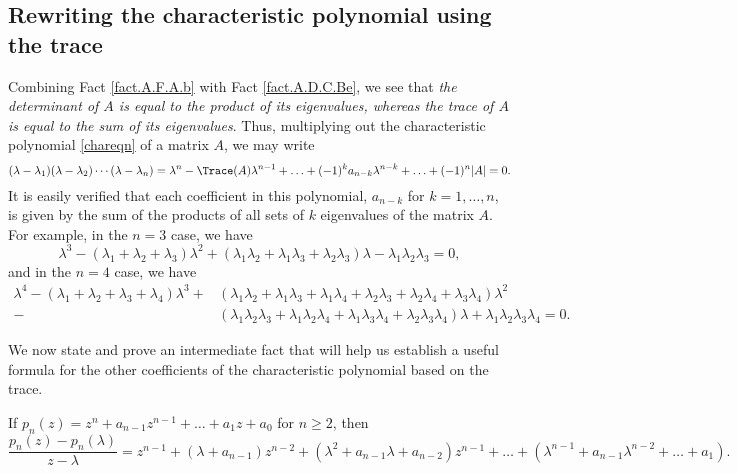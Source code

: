 \subsection{Rewriting the characteristic polynomial using the trace}

Combining Fact \ref{fact.A.F.A.b} with Fact \ref{fact.A.D.C.Be}, we see that
{\it the determinant of $A$ is equal to the product of its eigenvalues,
whereas the trace of $A$ is equal to the sum of its eigenvalues}.  Thus, multiplying out the characteristic polynomial \eqref{chareqn} of a matrix $A$, we may write
\begin{equation}
  (\lambda-\lambda_1) (\lambda-\lambda_2) \cdots (\lambda - \lambda_n) = \lambda^n - \Trace(A) \lambda^{n-1} + \ldots + (-1)^k a_{n-k} \lambda^{n-k} + \ldots + (-1)^n |A| = 0.
  \label{chareqnaaa}
\end{equation}
It is easily verified that each coefficient in this polynomial,  $a_{n-k}$ for $k=1,\ldots,n$, is given by the sum of the products of all sets of $k$ eigenvalues of the matrix $A$.  For example, in the $n=3$ case, we have
\begin{equation*}
  \lambda^3 - (\lambda_1+\lambda_2+\lambda_3) \lambda^{2} + (\lambda_1\lambda_2+\lambda_1\lambda_3+\lambda_2\lambda_3) \lambda  - \lambda_1\lambda_2\lambda_3 = 0,
\end{equation*}
and in the $n=4$ case, we have
\begin{align*}
  \lambda^4 - (\lambda_1+\lambda_2+\lambda_3+\lambda_4) \lambda^{3}
  + & (\lambda_1\lambda_2+\lambda_1\lambda_3+\lambda_1\lambda_4+\lambda_2\lambda_3+\lambda_2\lambda_4+\lambda_3\lambda_4) \lambda^2 \\
  - & (\lambda_1\lambda_2\lambda_3+\lambda_1\lambda_2\lambda_4+\lambda_1\lambda_3\lambda_4+\lambda_2\lambda_3\lambda_4) \lambda
  + \lambda_1\lambda_2\lambda_3\lambda_4 = 0.
\end{align*}

We now state and prove an intermediate fact that will help us establish a useful formula for the other coefficients of the characteristic polynomial based on the trace.

\begin{fact}\label{fact:pz-plambda/z-lambda} If $p_n(z)=z^n + a_{n-1} z^{n-1} + \ldots + a_{1} z + a_{0}$ for $n\ge 2$, then
\begin{equation*}
  \frac{p_n(z)-p_n(\lambda)}{z-\lambda} = z^{n-1} + (\lambda + a_{n-1}) z^{n-2} + (\lambda^2 + a_{n-1} \lambda + a_{n-2}) z^{n-1} + \ldots + (\lambda^{n-1} + a_{n-1} \lambda^{n-2} + \ldots + a_{1}).
\end{equation*}
\end{fact}

